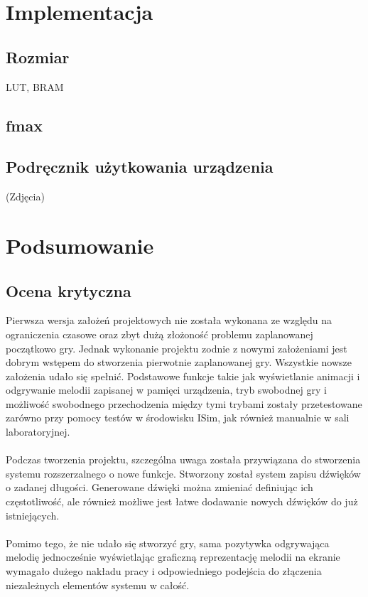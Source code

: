\documentclass[a4paper]{report}
\begin{document}
\chapter{Implementacja}
	\section{Rozmiar}
	LUT, BRAM
	\section{fmax}
	\section{Podręcznik użytkowania urządzenia}
	(Zdjęcia)
	
\chapter{Podsumowanie}
	\section{Ocena krytyczna}
	Pierwsza wersja założeń projektowych nie została wykonana ze względu na ograniczenia czasowe oraz zbyt dużą złożoność problemu zaplanowanej początkowo gry. Jednak wykonanie projektu zodnie z nowymi założeniami jest dobrym wstępem do stworzenia pierwotnie zaplanowanej gry. Wszystkie nowsze założenia udało się spełnić. Podstawowe funkcje takie jak wyświetlanie animacji i odgrywanie melodii zapisanej w pamięci urządzenia, tryb swobodnej gry i możliwość swobodnego przechodzenia między tymi trybami zostały przetestowane zarówno przy pomocy testów w środowisku ISim, jak również manualnie w sali laboratoryjnej.
\\\\Podczas tworzenia projektu, szczególna uwaga została przywiązana do stworzenia systemu rozszerzalnego o nowe funkcje. Stworzony został system zapisu dźwięków o zadanej długości. Generowane dźwięki można zmieniać definiując ich częstotliwość, ale również możliwe jest łatwe dodawanie nowych dźwięków do już istniejących.
\\\\Pomimo tego, że nie udało się stworzyć gry, sama pozytywka odgrywająca melodię jednocześnie wyświetlając graficzną reprezentację melodii na ekranie wymagało dużego nakładu pracy i odpowiedniego podejścia do złączenia niezależnych elementów systemu w całość.
\end{document}
